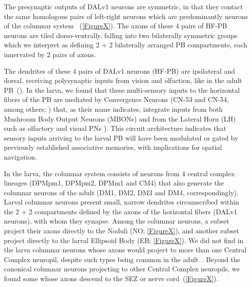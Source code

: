 \documentclass{article}
\begin{document}
The presynaptic outputs of DALv1 neurons are symmetric, in that they contact the same homologous pairs of left-right neurons which are predominantly neurons of the columnar system ~(\ref{FigureX}).
The axons of these 4 pairs of HF-PB neurons are tiled dorso-ventrally, falling into two bilaterally symmetric groups which we interpret as defining 2 + 2 bilaterally arranged PB compartments, each innervated by 2 pairs of axons. %

The dendrites of these 4 pairs of DALv1 neurons (HF-PB) are ipsilateral and dorsal, receiving polysynaptic inputs from vision and olfaction, like in the adult PB~(\citep{hulse2021connectome}). In the larva, we found that these multi-sensory inputs to the horizontal fibers of the PB are mediated by Convergence Neurons (CN-53 and CN-54, among others; \citealp{eschbach2021}) that, as their name indicates, integrate inputs from both Mushroom Body Output Neurons (MBONs) and from the Lateral Horn (LH) such as olfactory and visual PNs \citep{EsbachFushiki2021}). This circuit architecture indicates that sensory inputs arriving to the larval PB will have been modulated or gated by previously established associative memories, with implications for spatial navigation.





In the larva, the columnar system consists of neurons from 4 central complex lineages (DPMpm1, DPMpm2, DPMm1 and CM4) that also generate the columnar neurons of the adult (DM1, DM2, DM3 and DM4, correspondingly).
Larval columnar neurons present small, narrow dendrites circumscribed within the 2 + 2 compartments defined by the axons of the horizontal fibers (DALv1 neurons), with whom they synapse.
Among the columnar neurons, a subset project their axons directly to the Noduli (NO; \ref{FigureX}), and another subset project directly to the larval Ellipsoid Body (EB; \ref{FigureX}).
We did not find in the larva columnar neurons whose axons would project to more than one Central Complex neuropil, despite such types being common in the adult~\citep{wolff2015neuroarchitecture; wolff2018; hulse2021connectome}.
Beyond the canonical columnar neurons projecting to other Central Complex neuropils, we found some whose axons descend to the SEZ or nerve cord~(\ref{FigureX}).
\end{document}
